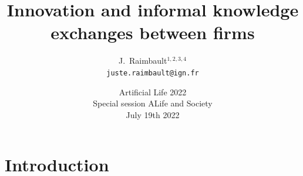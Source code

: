 \documentclass[english,11pt]{beamer}
\begin{document}
\title{Innovation and informal knowledge exchanges between firms}

\author{J.~Raimbault$^{1,2,3,4}$\\
\texttt{juste.raimbault@ign.fr}
}




\date{Artificial Life 2022\\
Special session ALife and Society\\
July 19th 2022
}




\frame{\maketitle}


\section{Introduction}
\end{document}
